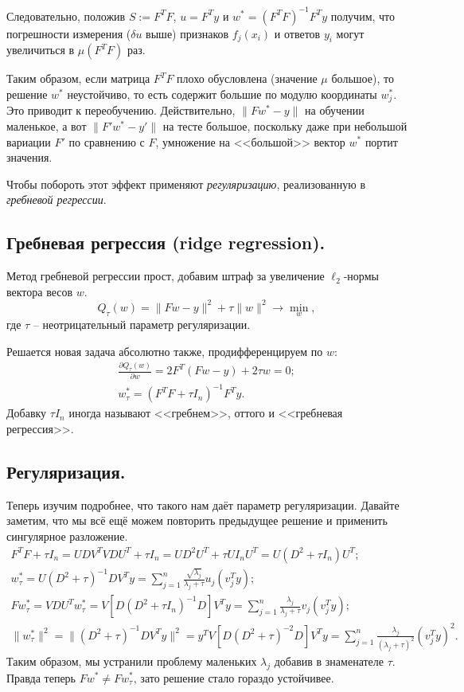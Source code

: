 Следовательно, положив $S := F^T F$, $u = F^T y$ и $w^* = (F^T F)^{-1} F^T y$ получим, что погрешности измерения ($\delta u$ выше) признаков $f_j(x_i)$ и ответов $y_i$ могут увеличиться в $\mu(F^T F)$ раз.

Таким образом, если матрица $F^TF$ плохо обусловлена (значение $\mu$ большое), то решение $w^*$ неустойчиво, то есть содержит большие по модулю координаты $w_j^*$. Это приводит к переобучению. Действительно, $\|Fw^* - y\|$ на обучении маленькое, а вот $\|F'w^* - y'\|$ на тесте большое, поскольку даже при небольшой вариации $F'$ по сравнению с $F$, умножение на <<большой>> вектор $w^*$ портит значения.

Чтобы побороть этот эффект применяют \textit{регуляризацию}, реализованную в \textit{гребневой регрессии}.

\subsection*{Гребневая регрессия (ridge regression).}
Метод гребневой регрессии прост, добавим штраф за увеличение $\ell_2$-нормы вектора весов $w$.
$$Q_\tau(w) = \|Fw - y\|^2 + \tau \|w\|^2 \to \min_w,$$
где $\tau$ -- неотрицательный параметр регуляризации.

Решается новая задача абсолютно также, продифференцируем по $w$:
\begin{gather*}
  \frac{\partial Q_\tau(w)}{\partial w} = 2 F^T (Fw - y) + 2\tau w = 0; \\
  w_\tau^* = (F^TF + \tau I_n)^{-1} F^Ty.
\end{gather*}
Добавку $\tau I_n$ иногда называют <<гребнем>>, оттого и <<гребневая регрессия>>.

\subsection*{Регуляризация.}
Теперь изучим подробнее, что такого нам даёт параметр регуляризации.
Давайте заметим, что мы всё ещё можем повторить предыдущее решение и применить сингулярное разложение.
\begin{gather*}
  F^TF + \tau I_n = UDV^TVDU^T + \tau I_n = UD^2U^T + \tau UI_nU^T = U(D^2 + \tau I_n)U^T; \\
  w_\tau^* = U(D^2 + \tau)^{-1}DV^Ty = \sum_{j=1}^n \frac{\sqrt{\lambda_j}}{\lambda_j + \tau}u_j(v_j^Ty); \\
  Fw_\tau^* = VDU^Tw_\tau^* = V\left[D(D^2 + \tau I_n)^{-1}D\right]V^Ty = \sum_{j=1}^n \frac{\lambda_j}{\lambda_j + \tau} v_j(v_j^Ty); \\
  \|w_\tau^*\|^2 = \|(D^2 + \tau)^{-1}DV^Ty\|^2 = y^TV\left[D(D^2 + \tau)^{-2}D\right]V^Ty = \sum_{j=1}^n \frac{\lambda_j}{(\lambda_j + \tau)^2}(v_j^Ty)^2.
\end{gather*}
Таким образом, мы устранили проблему маленьких $\lambda_j$ добавив в знаменателе $\tau$. Правда теперь $Fw^* \not= Fw_\tau^*$, зато решение стало гораздо устойчивее.

